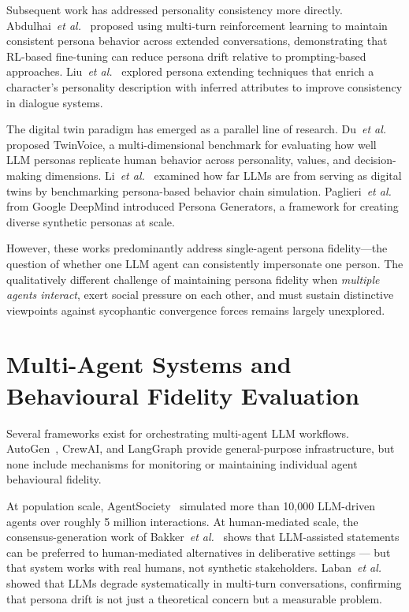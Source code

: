 \documentclass[12pt, a4paper]{report}
\newcommand{\etal}{\textit{et al.}}
\begin{document}
Subsequent work has addressed personality consistency more directly. Abdulhai~\etal~\cite{abdulhai2025} proposed using multi-turn reinforcement learning to maintain consistent persona behavior across extended conversations, demonstrating that RL-based fine-tuning can reduce persona drift relative to prompting-based approaches. Liu~\etal~\cite{liu2022extending} explored persona extending techniques that enrich a character's personality description with inferred attributes to improve consistency in dialogue systems.

The digital twin paradigm has emerged as a parallel line of research. Du~\etal~\cite{du2025twinvoice} proposed TwinVoice, a multi-dimensional benchmark for evaluating how well LLM personas replicate human behavior across personality, values, and decision-making dimensions. Li~\etal~\cite{li2025digitaltwin} examined how far LLMs are from serving as digital twins by benchmarking persona-based behavior chain simulation. Paglieri~\etal~\cite{paglieri2026persona} from Google DeepMind introduced Persona Generators, a framework for creating diverse synthetic personas at scale.

However, these works predominantly address single-agent persona fidelity---the question of whether one LLM agent can consistently impersonate one person. The qualitatively different challenge of maintaining persona fidelity when \textit{multiple agents interact}, exert social pressure on each other, and must sustain distinctive viewpoints against sycophantic convergence forces remains largely unexplored.


\section{Multi-Agent Systems and Behavioural Fidelity Evaluation}

Several frameworks exist for orchestrating multi-agent LLM workflows. AutoGen~\cite{autogen2024}, CrewAI, and LangGraph provide general-purpose infrastructure, but none include mechanisms for monitoring or maintaining individual agent behavioural fidelity.

At population scale, AgentSociety~\cite{agentsociety2025} simulated more than 10,000 LLM-driven agents over roughly 5 million interactions. At human-mediated scale, the consensus-generation work of Bakker~\etal~\cite{bakker2024habermas} shows that LLM-assisted statements can be preferred to human-mediated alternatives in deliberative settings --- but that system works with real humans, not synthetic stakeholders. Laban~\etal~\cite{laban2025lost} showed that LLMs degrade systematically in multi-turn conversations, confirming that persona drift is not just a theoretical concern but a measurable problem.
\end{document}
